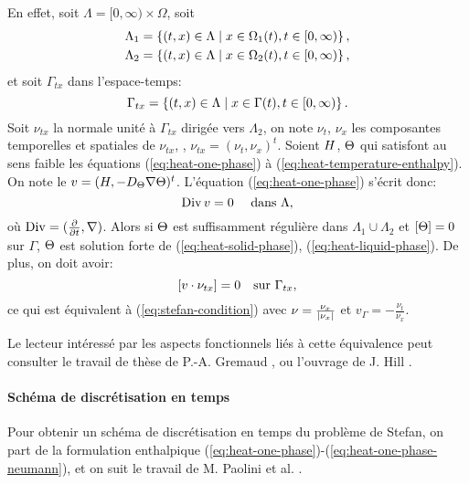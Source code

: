 En effet, soit $\Lambda = [0, \infty)\times \Omega$, soit
\begin{align}
  & \Lambda_1 = \left\{ (t, x)\in\Lambda\mid x \in \Omega_1(t), t \in
  [0,\infty) \right\},\\
  & \Lambda_2 = \left\{ (t, x)\in\Lambda\mid x \in \Omega_2(t), t \in
  [0,\infty) \right\},\\
\end{align}
et soit $\Gamma_{tx}$ dans l'espace-temps:
\begin{equation}
  \Gamma_{tx} = \left\{ (t, x) \in \Lambda\mid x \in \Gamma(t), t \in
  [0,\infty) \right\}.
\end{equation}
Soit $\nu_{tx}$ la normale unité à $\Gamma_{tx}$ dirigée vers
$\Lambda_2$, on note $\nu_t$, $\nu_x$ les composantes temporelles et
spatiales de $\nu_{tx}$, \ie, $\nu_{tx} = (\nu_t, \nu_x)^t$. Soient
$H$, $\Theta$ qui satisfont au sens faible les équations
(\ref{eq:heat-one-phase}) à (\ref{eq:heat-temperature-enthalpy}). On
note le $v = (H, -D_\Theta\nabla
\Theta)^t$. L'équation (\ref{eq:heat-one-phase}) s'écrit donc:
\begin{equation}\label{eq:space-time-divergence}
  \operatorname{Div} v = 0 \quad\text{ dans }\Lambda,
\end{equation}
où $\operatorname{Div} = (\frac{\partial}{\partial t}, \nabla)$. Alors si
$\Theta$ est suffisamment régulière dans
$\Lambda_1\cup\Lambda_2$ et $\left[ \Theta \right] = 0$ sur $\Gamma$,
$\Theta$ est solution forte de (\ref{eq:heat-solid-phase}),
(\ref{eq:heat-liquid-phase}). De plus, on doit avoir:
\begin{equation}
  \left[ v\cdot \nu_{tx} \right] = 0 \quad \text{sur } \Gamma_{tx},
\end{equation}
ce qui est équivalent à (\ref{eq:stefan-condition}) avec $\nu =
\frac{\nu_x}{\left\lvert \nu_x \right\rvert}$ et $v_\Gamma = -\frac{\nu_t}{\nu_x}$.

Le lecteur intéressé par les aspects fonctionnels liés à cette
équivalence peut consulter le travail de thèse de
P.-A. Gremaud \cite{Gremaud1991}, ou l'ouvrage de J. Hill
\cite{HillStefanProblems}.

\paragraph{Schéma de discrétisation en temps}
Pour obtenir un schéma de discrétisation en temps du problème de
Stefan, on part de la formulation enthalpique
(\ref{eq:heat-one-phase})-(\ref{eq:heat-one-phase-neumann}), et on
suit le travail de M. Paolini et al. \cite{Paolini1988}.

